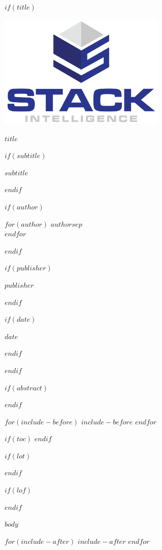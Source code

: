 \documentclass[$if(fontsize)$$fontsize$,$endif$$if(papersize)$$papersize$,$endif$$for(classoption)$$classoption$$sep$,$endfor$]{$documentclass$}
\renewcommand{\maketitle}{%
  \begin{titlepage}
    \centering
    \vspace*{2cm}
    
    \includegraphics[width=0.6\textwidth]{./images/Stack Intelligence With Logo.png}\\[3cm]
    
    {\Huge\bfseries\color{primaryBlue} $title$\par}
    \vspace{1cm}
    
    $if(subtitle)$
    {\Large\color{secondaryText} $subtitle$\par}
    \vspace{1cm}
    $endif$
    
    $if(author)$
    {\large\color{secondaryText}
      $for(author)$
        $author$$sep$\\
      $endfor$
    \par}
    \vspace{0.5cm}
    $endif$
    
    $if(publisher)$
    {\large\color{secondaryText} $publisher$\par}
    $endif$
    
    $if(date)$
    {\large\color{secondaryText} $date$\par}
    $endif$
    
    \vfill
    
    \colorbox{primaryOrange}{\makebox[\textwidth][c]{\textcolor{white}{\large\bfseries Executive Guide}}}
  \end{titlepage}
}
\begin{document}
$if(title)$
\maketitle
$endif$

$if(abstract)$
\begin{abstract}
$abstract$
\end{abstract}
$endif$

$for(include-before)$
$include-before$
$endfor$

$if(toc)$
{
  \hypersetup{linkcolor=primaryBlue}
  \setcounter{tocdepth}{3}
  \tableofcontents
}
$endif$

$if(lot)$
\listoftables
$endif$

$if(lof)$
\listoffigures
$endif$

$body$

$for(include-after)$
$include-after$
$endfor$
\end{document}
